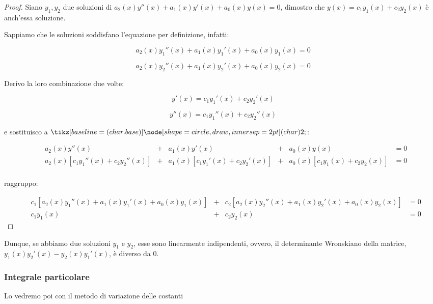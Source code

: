 \begin{proof}
    Siano \(y_1, y_2\) due soluzioni di \(a_2(x)y''(x) + a_1(x) y'(x) + a_0(x) y(x) = 0\), dimostro che \(y(x) = c_1 y_1(x) + c_2 y_2(x)\) è anch'essa soluzione.

    Sappiamo che le soluzioni soddisfano l'equazione per definizione, infatti:

    \[
        a_2(x)y_1''(x) + a_1(x) y_1'(x) + a_0(x) y_1(x) = 0
    \]

    \[
        a_2(x)y_2''(x) + a_1(x) y_2'(x) + a_0(x) y_2(x) = 0
    \]

    Derivo la loro combinazione due volte:

    \[
        y'(x) = c_1 y_1'(x) + c_2 y_2'(x)
    \]

    \[
        y''(x) = c_1 y_1''(x) + c_2 y_2''(x)
    \]

    e sostituisco a \(\circled{2}\):

    \begin{align*}
         & a_2(x)y''(x)                           & + & a_1(x) y'(x)                        & + & a_0(x) y(x)                       & = 0 \\
         & a_2(x) [ c_1y_1''(x) + c_2 y_2 ''(x) ] & + & a_1(x)[ c_1 y_1'(x) + c_2 y_2'(x) ] & + & a_0(x) [ c_1 y_1(x) + c_2 y_2(x)] & = 0 \\
    \end{align*}

    raggruppo:

    \begin{align*}
         & c_1[a_2(x) y_1''(x) + a_1(x) y_1'(x) + a_0(x) y_1(x)] & + & c_2 [a_2(x) y_2''(x) + a_1(x) y_2'(x) + a_0(x) y_2(x)] & = 0 \\
         & c_1 y_1(x)                                            & + & c_2 y_2(x)                                             & = 0
    \end{align*}
\end{proof}

Dunque, se abbiamo due soluzioni \(y_1\) e \(y_2\), esse sono linearmente indipendenti, ovvero, il determinante Wronskiano della matrice, \(y_1(x)y_2'(x)-y_2(x)y_1'(x)\), è diverso da 0.

\subsubsection*{Integrale particolare}

Lo vedremo poi con il metodo di variazione delle costanti

